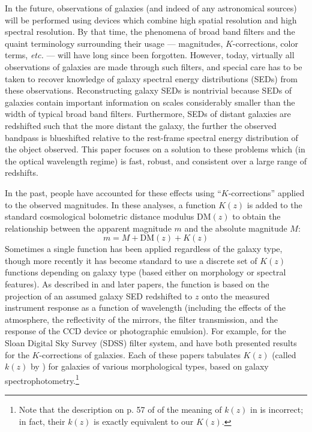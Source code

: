 \documentclass[10pt,preprint]{aastex}
\begin{document}
In the future, observations of galaxies (and indeed of any
astronomical sources) will be performed using devices which combine
high spatial resolution and high spectral resolution. By that time,
the phenomena of broad band filters and the quaint terminology
surrounding their usage --- magnitudes, $K$-corrections, color terms,
{\it etc.} --- will have long since been forgotten. However, today,
virtually all observations of galaxies are made through such filters,
and special care has to be taken to recover knowledge of galaxy
spectral energy distributions (SEDs) from these observations.
Reconstructing galaxy SEDs is nontrivial because SEDs of galaxies
contain important information on scales considerably smaller than the
width of typical broad band filters. Furthermore, SEDs of distant
galaxies are redshifted such that the more distant the galaxy, the
further the observed bandpass is blueshifted relative to the
rest-frame spectral energy distribution of the object observed.  This
paper focuses on a solution to these problems which (in the optical
wavelength regime) is fast, robust, and consistent over a large range
of redshifts.

In the past, people have accounted for these effects using
``$K$-corrections'' applied to the observed magnitudes. In these
analyses, a function $K(z)$ is added to the standard cosmological
bolometric distance modulus $\mathrm{DM}(z)$ to obtain the
relationship between the apparent magnitude $m$ and the absolute
magnitude $M$: 
\begin{equation}
m = M + \mathrm{DM}(z) + K(z)
\end{equation}
Sometimes a single function has been applied regardless of the galaxy
type, though more recently it has become standard to use a discrete
set of $K(z)$ functions depending on galaxy type (based either on
morphology or spectral features). As described in \cite{oke68a} and
later papers, the function is based on the projection of an assumed
galaxy SED redshifted to $z$ onto the measured instrument response as
a function of wavelength (including the effects of the atmosphere, the
reflectivity of the mirrors, the filter transmission, and the response
of the CCD device or photographic emulsion). For example, for the
Sloan Digital Sky Survey (SDSS) filter system, \citet{frei94a} and
\citet{fukugita95a} have both presented results for the
$K$-corrections of galaxies. Each of these papers tabulates $K(z)$
(called $k(z)$ by \citealt{frei94a}) for galaxies of various
morphological types, based on galaxy spectrophotometry.\footnote{Note
that the description on p. 57 of \citet{binney98a} of the meaning of
$k(z)$ in \citet{frei94a} is incorrect; in fact, their $k(z)$ is
exactly equivalent to our $K(z)$.}
\end{document}
